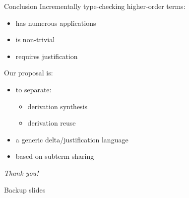 \documentclass{beamer}
\theoremstyle{example}
\begin{document}
\begin{frame}{Conclusion}
  Incrementally type-checking higher-order terms:
  \begin{itemize}
  \item has numerous applications
  \item is non-trivial
  \item requires justification
  \end{itemize}
  \vspace{1em}

  Our proposal is:
  \begin{itemize}
  \item to separate:
    \begin{itemize}
    \item derivation synthesis
    \item derivation reuse
    \end{itemize}
  \item a generic delta/justification language
  \item based on subterm sharing
  \end{itemize}

  \pause
  \vspace{1em}
  \begin{center}
    { \Large \it Thank you!}
  \end{center}
\end{frame}

\appendix
{}
\setcounter{finalframe}{\value{framenumber}}

\begin{frame}{}
  \begin{center}
    \huge Backup slides
  \end{center}
\end{frame}
\end{document}
